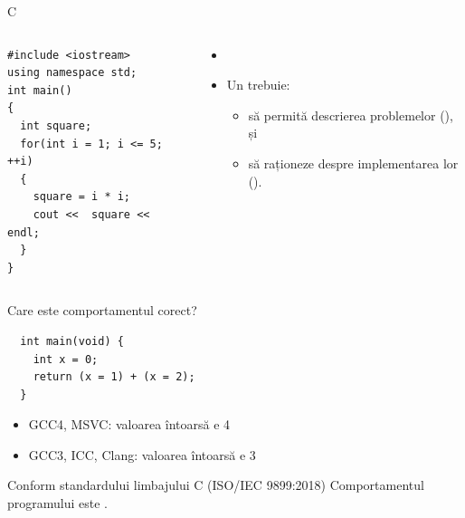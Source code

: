 \documentclass[xcolor=pdftex,romanian,colorlinks]{beamer}
\begin{document}
\begin{frame}[fragile]{C}
\begin{columns}
\begin{column}{.5\textwidth}
\begin{verbatim}
#include <iostream> 
using namespace std;
int main() 
{
  int square; 
  for(int i = 1; i <= 5; ++i)
  { 
    square = i * i;
    cout <<  square << endl; 
  }
}
\end{verbatim}
\end{column}
\begin{column}{.5\textwidth}
\begin{itemize}
	\pause \vspace{-.4cm}
	\item {} \pause {}
	\vspace{.2cm}
	\pause
	\item Un  trebuie:
	\begin{itemize}
		\item să permită descrierea problemelor (), și
		\item să raționeze despre implementarea lor ().
	\end{itemize}
\end{itemize}
\end{column}
\end{columns}
\end{frame}

\begin{frame}[fragile]{Care este comportamentul corect?}

\begin{verbatim}
  int main(void) {
    int x = 0;
    return (x = 1) + (x = 2);
  }
\end{verbatim}
\pause
\begin{itemize}
\item GCC4, MSVC: valoarea întoarsă e \alert{4}
\item GCC3, ICC, Clang: valoarea întoarsă e \alert{3}
\end{itemize}
\begin{alertblock}{Conform standardului limbajului C (ISO/IEC 9899:2018)}
  Comportamentul programului este .
\end{alertblock}
\end{frame}
\end{document}
